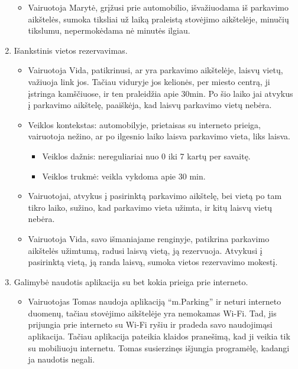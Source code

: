 \documentclass{VUMIFPSkursinis}
\begin{document}
\begin{enumerate}[label = \textbf{PV\arabic*.}]
\begin{itemize}[label={-}]
			\item Vairuotoja Marytė, grįžusi prie automobilio, išvažiuodama iš parkavimo aikštelės, sumoka tiksliai už laiką praleistą stovėjimo aikštelėje, minučių tikslumu, nepermokėdama nė minutės ilgiau.
		\end{itemize}
		
	\item Išankstinis vietos rezervavimas.
		\begin{itemize}[label={-}]
			\item Vairuotoja Vida, patikrinusi, ar yra parkavimo aikštelėje, laisvų vietų, važiuoja link jos. Tačiau viduryje jos kelionės, per miesto centrą, ji įstringa kamščiuose, ir ten praleidžia apie 30min. Po šio laiko jai atvykus į parkavimo aikštelę, paaiškėja, kad laisvų parkavimo vietų nebėra.

			\item Veiklos kontekstas: automobilyje, prietaisas su interneto prieiga, vairuotoja nežino, ar po ilgesnio laiko laisva parkavimo vieta, liks laisva.
				\begin{itemize}[label={$\bullet$}]
					\item Veiklos dažnis: nereguliariai nuo 0 iki 7 kartų per savaitę.
					\item Veiklos trukmė: veikla vykdoma apie 30 min.
				\end{itemize}
			\item Vairuotojai, atvykus į pasirinktą parkavimo aikštelę, bei vietą po tam tikro laiko, sužino, kad parkavimo vieta užimta, ir kitų laisvų vietų nebėra.

			\item Vairuotoja Vida, savo išmaniajame renginyje, patikrina parkavimo aikštelės užimtumą, radusi laisvą vietą, ją rezervuoja. Atvykusi į pasirinktą vietą, ją randa laisvą, sumoka vietos rezervavimo mokestį.
		\end{itemize}
	\item Galimybė naudotis aplikacija su bet kokia prieiga prie interneto.
		\begin{itemize}[label={-}]
			\item Vairuotojas Tomas naudoja aplikaciją “m.Parking” ir neturi interneto duomenų, tačiau stovėjimo aikštelėje yra nemokamas Wi-Fi. Tad, jis prijungia prie interneto su Wi-Fi ryšiu ir pradeda savo naudojimąsi aplikacija. Tačiau aplikacija pateikia klaidos pranešimą, kad ji veikia tik su mobiliuoju internetu. Tomas susierzinęs išjungia programėlę, kadangi ja naudotis negali.


\end{itemize}
\end{enumerate}
\end{document}
